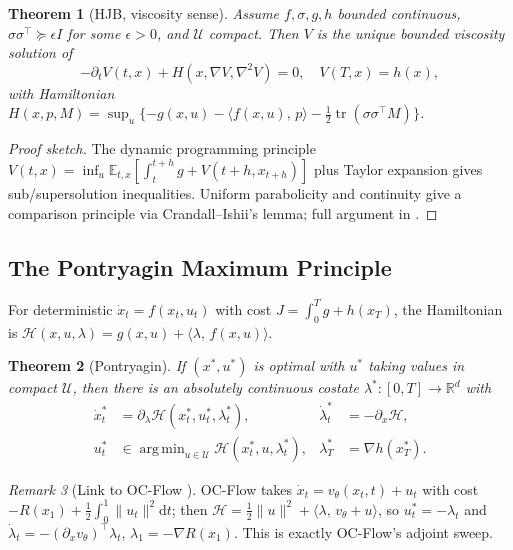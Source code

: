 \documentclass[11pt,letterpaper]{article}
\theoremstyle{plain}
\newtheorem{theorem}{Theorem}[section]
\theoremstyle{definition}
\theoremstyle{remark}
\newtheorem{remark}[theorem]{Remark}
\newcommand{\R}{\mathbb{R}}
\newcommand{\E}{\mathbb{E}}
\newcommand{\dd}{\mathrm{d}}
\newcommand{\calU}{\mathcal{U}}
\newcommand{\calH}{\mathcal{H}}
\newcommand{\tr}{\operatorname{tr}}
\newcommand{\grad}{\nabla}
\newcommand{\inner}[2]{\langle #1,\,#2\rangle}
\newcommand{\norm}[1]{\lVert #1\rVert}
\DeclareMathOperator*{\argmin}{arg\,min}
\begin{document}
\begin{theorem}[HJB, viscosity sense]\label{thm:hjb-app}
Assume $f,\sigma,g,h$ bounded continuous, $\sigma\sigma^\top\succeq\epsilon I$
for some $\epsilon>0$, and $\calU$ compact. Then $V$ is the unique bounded
viscosity solution of
\begin{equation}
  -\partial_t V(t,x)+H(x,\grad V,\nabla^2 V)=0,\quad V(T,x)=h(x),
  \label{eq:hjb-app}
\end{equation}
with Hamiltonian
$H(x,p,M)=\sup_u\{-g(x,u)-\inner{f(x,u)}{p}-\tfrac12\tr(\sigma\sigma^\top M)\}$.
\end{theorem}
\begin{proof}[Proof sketch]
The dynamic programming principle
$V(t,x)=\inf_u\E_{t,x}[\int_t^{t+h}g+V(t+h,x_{t+h})]$
plus Taylor expansion gives sub/supersolution inequalities.
Uniform parabolicity and continuity give a comparison principle
via Crandall--Ishii's lemma; full argument in \citep[Ch.~4]{fleming-soner2006}.
\end{proof}

\subsection{The Pontryagin Maximum Principle}\label{app:pmp}

For deterministic $\dot x_t=f(x_t,u_t)$ with cost
$J=\int_0^T g+h(x_T)$, the Hamiltonian is
$\calH(x,u,\lambda)=g(x,u)+\inner{\lambda}{f(x,u)}$.

\begin{theorem}[Pontryagin]\label{thm:pmp-app}
If $(x^*,u^*)$ is optimal with $u^*$ taking values in compact $\calU$, then
there is an absolutely continuous costate $\lambda^*:[0,T]\to\R^d$ with
\begin{align}
  \dot x_t^*&=\partial_\lambda\calH(x_t^*,u_t^*,\lambda_t^*),
  &\dot\lambda_t^*&=-\partial_x\calH,\\
  u_t^*&\in\argmin_{u\in\calU}\calH(x_t^*,u,\lambda_t^*),
  &\lambda_T^*&=\grad h(x_T^*).
\end{align}
\end{theorem}

\begin{remark}[Link to OC-Flow \citep{ocflow}]
OC-Flow takes $\dot x_t=v_\theta(x_t,t)+u_t$ with cost
$-R(x_1)+\tfrac12\int_0^1\norm{u_t}^2\dd t$; then
$\calH=\tfrac12\norm{u}^2+\inner{\lambda}{v_\theta+u}$,
so $u_t^*=-\lambda_t$ and
$\dot\lambda_t=-(\partial_x v_\theta)^\top\lambda_t$, $\lambda_1=-\grad R(x_1)$.
This is exactly OC-Flow's adjoint sweep.
\end{remark}
\end{document}
